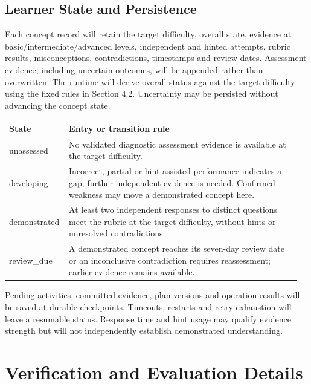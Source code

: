\documentclass{article}
\begin{document}
\subsection{Learner State and Persistence}

Each concept record will retain the target difficulty, overall state, evidence at basic/intermediate/advanced levels, independent and hinted attempts, rubric results, misconceptions, contradictions, timestamps and review dates. Assessment evidence, including uncertain outcomes, will be appended rather than overwritten. The runtime will derive overall status against the target difficulty using the fixed rules in Section 4.2. Uncertainty may be persisted without advancing the concept state.

{\small
\begin{tabular}{@{}>{\raggedright\arraybackslash}p{0.18\linewidth}>{\raggedright\arraybackslash}p{0.78\linewidth}@{}}
\toprule
\textbf{State} & \textbf{Entry or transition rule} \\
\midrule
unassessed & No validated diagnostic assessment evidence is available at the target difficulty. \\
\addlinespace[2pt]
developing & Incorrect, partial or hint-assisted performance indicates a gap; further independent evidence is needed. Confirmed weakness may move a demonstrated concept here. \\
\addlinespace[2pt]
demonstrated & At least two independent responses to distinct questions meet the rubric at the target difficulty, without hints or unresolved contradictions. \\
\addlinespace[2pt]
review\_due & A demonstrated concept reaches its seven-day review date or an inconclusive contradiction requires reassessment; earlier evidence remains available. \\
\bottomrule
\end{tabular}
}

Pending activities, committed evidence, plan versions and operation results will be saved at durable checkpoints. Timeouts, restarts and retry exhaustion will leave a resumable status. Response time and hint usage may qualify evidence strength but will not independently establish demonstrated understanding.

\clearpage

\section{Verification and Evaluation Details}
\end{document}
